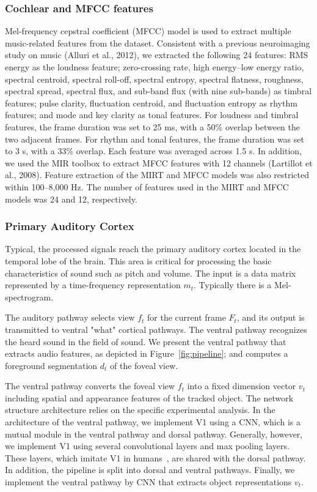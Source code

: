\documentclass[journal]{IEEEtran}
\begin{document}
\subsubsection{Cochlear and MFCC features}
Mel-frequency cepstral coefficient (MFCC) model is used to extract multiple music-related features from the dataset\cite{rabiner2010theory}.
Consistent with a previous neuroimaging study on music (Alluri et al., 2012), we extracted the following 24 features: 
RMS energy as the loudness feature; 
zero-crossing rate, 
high energy–low energy ratio, 
spectral centroid, 
spectral roll-off, 
spectral entropy, 
spectral flatness, 
roughness, 
spectral spread, 
spectral flux, 
and sub-band flux (with nine sub-bands) as timbral features; 
pulse clarity, 
fluctuation centroid, 
and fluctuation entropy as rhythm features; 
and mode and key clarity as tonal features. 
For loudness and timbral features, the frame duration was set to 25 ms, with a 50\% overlap between the two adjacent frames. 
For rhythm and tonal features, the frame duration was set to 3 s, with a 33\% overlap. 
Each feature was averaged across 1.5 s. 
In addition, we used the MIR toolbox to extract MFCC features with 12 channels (Lartillot et al., 2008). 
Feature extraction of the MIRT and MFCC models was also restricted within 100–8,000 Hz. 
The number of features used in the MIRT and MFCC models was 24 and 12, respectively.


\subsubsection{Primary Auditory Cortex}
Typical, the processed signals reach the primary auditory cortex located in the temporal lobe of the brain. 
This area is critical for processing the basic characteristics of sound such as pitch and volume.
The input is a data matrix represented by a time-frequency representation $ m_t $. 
Typically there is a Mel-spectrogram.

The auditory pathway selects view $f_t$ for the current frame $F_t$,
and its output is transmitted to ventral "what" cortical pathways.
The ventral pathway recognizes the heard sound in the field of sound. 
We present the ventral pathway that extracts audio features, as depicted in Figure~\ref{fig:pipeline};
and computes a foreground segmentation $d_t$ of the foveal view. 


The ventral pathway converts the foveal view $f_t$ into a fixed dimension vector $v_t$ including spatial and appearance features of the tracked object. 
The network structure architecture relies on the specific experimental analysis. 
In the architecture of the ventral pathway, we implement V1 using a CNN, which is a mutual module in the ventral pathway and dorsal pathway.
Generally, however, we implement V1 using several convolutional layers and max pooling layers. 
These layers, which imitate V1 in humans~\cite{theoretical_neuroscience}, are shared with the dorsal pathway.
In addition, the pipeline is split into dorsal and ventral pathways. 
Finally, we implement the ventral pathway by CNN that extracts object representations $v_t$.
\end{document}

